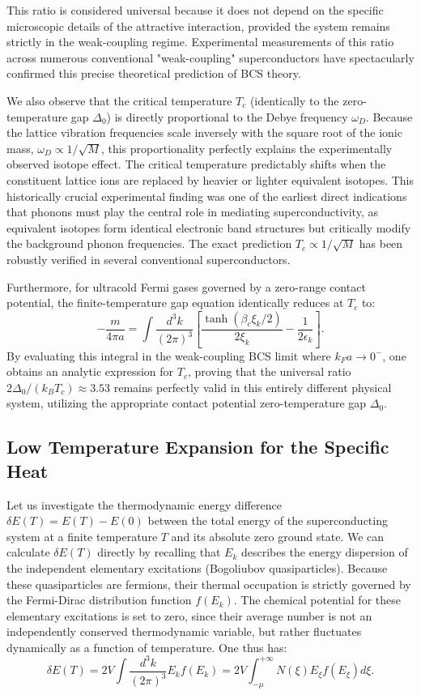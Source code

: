 This ratio is considered universal because it does not depend on the specific microscopic details of the attractive interaction, provided the system remains strictly in the weak-coupling regime. Experimental measurements of this ratio across numerous conventional "weak-coupling" superconductors have spectacularly confirmed this precise theoretical prediction of BCS theory.

We also observe that the critical temperature \( T_c \) (identically to the zero-temperature gap \( \Delta_0 \)) is directly proportional to the Debye frequency \( \omega_D \). Because the lattice vibration frequencies scale inversely with the square root of the ionic mass, \( \omega_D \propto 1/\sqrt{M} \), this proportionality perfectly explains the experimentally observed isotope effect. The critical temperature predictably shifts when the constituent lattice ions are replaced by heavier or lighter equivalent isotopes. This historically crucial experimental finding was one of the earliest direct indications that phonons must play the central role in mediating superconductivity, as equivalent isotopes form identical electronic band structures but critically modify the background phonon frequencies. The exact prediction \( T_c \propto 1/\sqrt{M} \) has been robustly verified in several conventional superconductors.

Furthermore, for ultracold Fermi gases governed by a zero-range contact potential, the finite-temperature gap equation identically reduces at \( T_c \) to:
\[
    -\frac{m}{4\pi a} = \int \frac{d^3k}{(2\pi)^3} \left[ \frac{\tanh(\beta_c \xi_k / 2)}{2\xi_k} - \frac{1}{2\epsilon_k} \right].
\]
By evaluating this integral in the weak-coupling BCS limit where \( k_F a \to 0^- \), one obtains an analytic expression for \( T_c \), proving that the universal ratio \( 2\Delta_0 / (k_B T_c) \approx 3.53 \) remains perfectly valid in this entirely different physical system, utilizing the appropriate contact potential zero-temperature gap \( \Delta_0 \).

\subsection{Low Temperature Expansion for the Specific Heat}

Let us investigate the thermodynamic energy difference \( \delta E(T) = E(T) - E(0) \) between the total energy of the superconducting system at a finite temperature \( T \) and its absolute zero ground state. We can calculate \( \delta E(T) \) directly by recalling that \( E_k \) describes the energy dispersion of the independent elementary excitations (Bogoliubov quasiparticles). Because these quasiparticles are fermions, their thermal occupation is strictly governed by the Fermi-Dirac distribution function \( f(E_k) \). The chemical potential for these elementary excitations is set to zero, since their average number is not an independently conserved thermodynamic variable, but rather fluctuates dynamically as a function of temperature. One thus has:
\[
    \delta E(T) = 2V \int \frac{d^3k}{(2\pi)^3} E_k f(E_k) = 2V \int_{-\mu}^{+\infty} N(\xi) E_\xi f(E_\xi) d\xi.
\]

